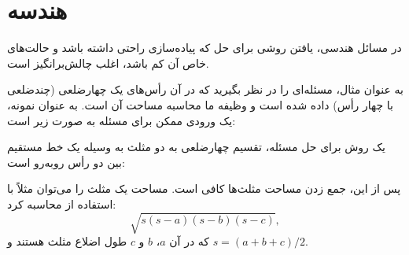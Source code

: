 \chapter{هندسه}


در مسائل هندسی، یافتن روشی برای حل که پیاده‌سازی راحتی داشته باشد و حالت‌های خاص آن کم باشد، اغلب چالش‌برانگیز است.

به عنوان مثال، مسئله‌ای را در نظر بگیرید که در آن رأس‌های یک چهارضلعی (چندضلعی با چهار رأس) داده شده است و وظیفه ما محاسبه مساحت آن است. به عنوان نمونه، یک ورودی ممکن برای مسئله به صورت زیر است:

\begin{center}
\end{center}
یک روش برای حل مسئله، تقسیم چهارضلعی به دو مثلث به وسیله یک خط مستقیم بین دو رأس روبه‌رو است:
\begin{center}
\end{center}
پس از این، جمع زدن مساحت مثلث‌ها کافی است. مساحت یک مثلث را می‌توان مثلاً با استفاده از  محاسبه کرد:
\[ \sqrt{s (s-a) (s-b) (s-c)},\]
که در آن $a$، $b$ و $c$ طول اضلاع مثلث هستند و $s=(a+b+c)/2$.

